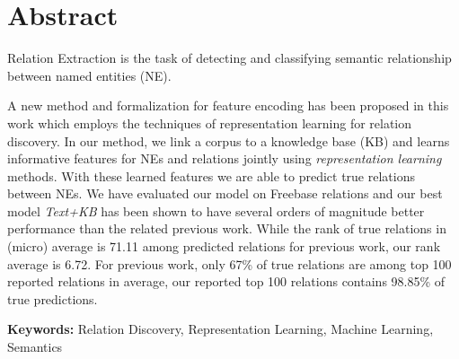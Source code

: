 \chapter*{Abstract}

Relation Extraction is the task of detecting and classifying semantic relationship 
between named entities (NE).



A new method and formalization for feature encoding has been proposed in this
work which employs the techniques of representation learning for relation discovery.
 In our method, we link a corpus to a knowledge base (KB)
and learns informative features for NEs and relations jointly using
\emph{representation learning} methods. With these learned features
we are able to predict true relations between NEs.
We have evaluated our model on Freebase relations and our best model
\emph{Text+KB} has been shown to have  several orders of
magnitude better performance than the related previous work. While the rank
of true relations in (micro) average is 71.11 among predicted relations for
previous work, our rank average is 6.72. For previous work, only 67\% of
true relations are among top 100 reported relations in average, our reported top
100 relations contains 98.85\% of true predictions.

\vspace{5cm}

\textbf{Keywords:} Relation Discovery, Representation Learning, Machine
Learning, Semantics

